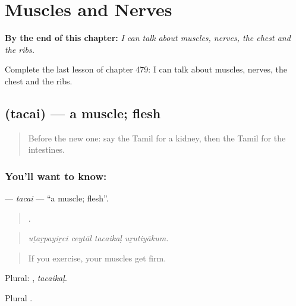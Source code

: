 
\chapter{Muscles and Nerves}
\label{ch:ta-muscles-and-nerves}

\begin{chapteropening}
\textbf{By the end of this chapter:} \emph{I can talk about muscles, nerves, the chest and the ribs.}

Complete the last lesson of chapter 479: I can talk about muscles, nerves, the chest and the ribs.
\end{chapteropening}

\section[\texorpdfstring{\ta{தசை} (tacai)}{தசை (tacai)}]{ (tacai) — a muscle; flesh}

\label{lesson:TA-C479-tacai}



\begin{quote}
Before the new one: say the Tamil for a kidney, then the Tamil for the intestines.
\end{quote}

\subsection*{You'll want to know: }
\textbf{} — \emph{tacai} — \textquotedblleft{}a muscle; flesh\textquotedblright{}.

\begin{quote}
   .
\end{quote}

\begin{quote}
\emph{uṭaṟpayiṟci ceytāl tacaikaḷ uṟutiyākum.}
\end{quote}

\begin{quote}
If you exercise, your muscles get firm.
\end{quote}

Plural: , \emph{tacaikaḷ}.

Plural .

